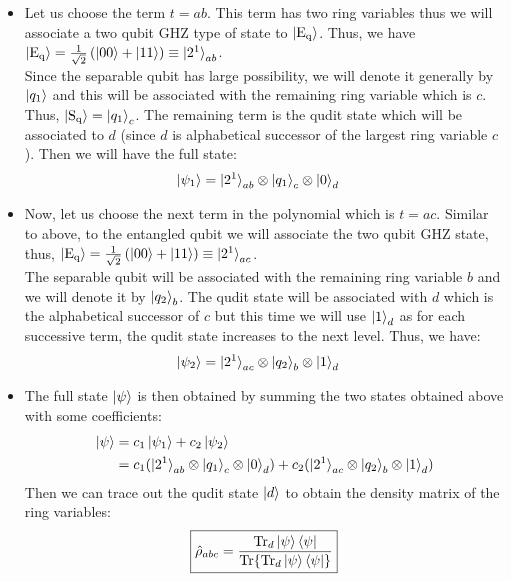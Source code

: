 \documentclass{scrartcl}
\begin{document}
\begin{itemize}
    \item Let us choose the term $t = ab$. This term has two ring variables thus we will associate a two qubit GHZ type of state to $\ket{\mathrm{E_q}}$. Thus, we have $\ket{\mathrm{E_q}} = \frac{1}{\sqrt{2}}\left( \ket{00} + \ket{11} \right)\equiv \ket{2^1}_{ab}$. \\[0.3cm]Since the separable qubit has large possibility, we will denote it generally by $\ket{q_1}$ and this will be associated with the remaining ring variable which is $c$. Thus, $\ket{\mathrm{S_q}} = \ket{q_1}_c$. The remaining term is the qudit state which will be associated to $d$ (since $d$ is alphabetical successor of the largest ring variable $c$). Then we will have the full state:
\begin{align*}
    \ket{\psi_1} &= \ket{2^1}_{ab}\otimes\ket{q_1}_c\otimes\ket{0}_d 
\end{align*}
\item Now, let us choose the next term in the polynomial which is $t = ac$. Similar to above, to the entangled qubit we will associate the two qubit GHZ state, thus, $\ket{\mathrm{E_q}} = \frac{1}{\sqrt{2}}\left( \ket{00} + \ket{11} \right)\equiv \ket{2^1}_{ac}$.\\[0.3cm] The separable qubit will be associated with the remaining ring variable $b$ and we will denote it by $\ket{q_2}_b$. The qudit state will be associated with $d$ which is the alphabetical successor of $c$ but this time we will use $\ket{1}_d$ as for each successive term, the qudit state increases to the next level. Thus, we have:
\begin{align*}
    \ket{\psi_2} &= \ket{2^1}_{ac}\otimes\ket{q_2}_b\otimes\ket{1}_d
\end{align*}
\item The full state $\ket{\psi}$ is then obtained by summing the two states obtained above with some coefficients:
\begin{align*}
    \ket{\psi} &= c_1\ket{\psi_1} + c_2\ket{\psi_2} \\
    &=c_1(\ket{2^1}_{ab}\otimes\ket{q_1}_c\otimes\ket{0}_d )+ c_2(\ket{2^1}_{ac}\otimes\ket{q_2}_b\otimes\ket{1}_d)
\end{align*}
Then we can trace out the qudit state $\ket{d}$ to obtain the density matrix of the ring variables:
$$\boxed{\hat{\rho}_{abc}=\frac{\Tr_d{\ket{\psi}\bra{\psi}}}{\Tr{\Tr_d{\ket{\psi}\bra{\psi}}}}} $$
\end{itemize}
\end{document}
